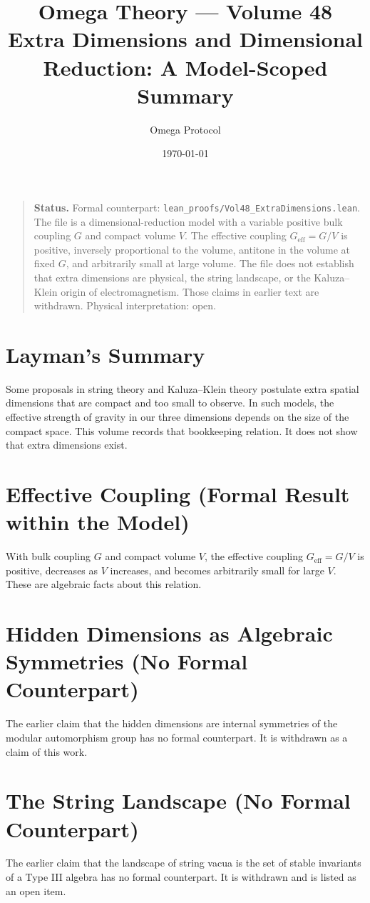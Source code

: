 \documentclass[11pt, a4paper]{article}
\title{Omega Theory --- Volume 48\\\Large Extra Dimensions and Dimensional Reduction: A Model-Scoped Summary}
\author{Omega Protocol}
\date{\today}
\begin{document}
\maketitle

\begin{quote}
\textbf{Status.} Formal counterpart: \texttt{lean\_proofs/Vol48\_ExtraDimensions.lean}. The file is a dimensional-reduction model with a variable positive bulk coupling $G$ and compact volume $V$. The effective coupling $G_{\text{eff}} = G/V$ is positive, inversely proportional to the volume, antitone in the volume at fixed $G$, and arbitrarily small at large volume. The file does not establish that extra dimensions are physical, the string landscape, or the Kaluza--Klein origin of electromagnetism. Those claims in earlier text are withdrawn. Physical interpretation: open.
\end{quote}

\section*{Layman's Summary}
Some proposals in string theory and Kaluza--Klein theory postulate extra spatial dimensions that are compact and too small to observe. In such models, the effective strength of gravity in our three dimensions depends on the size of the compact space. This volume records that bookkeeping relation. It does not show that extra dimensions exist.

\section{Effective Coupling (Formal Result within the Model)}
With bulk coupling $G$ and compact volume $V$, the effective coupling $G_{\text{eff}} = G/V$ is positive, decreases as $V$ increases, and becomes arbitrarily small for large $V$. These are algebraic facts about this relation.

\section{Hidden Dimensions as Algebraic Symmetries (No Formal Counterpart)}
The earlier claim that the hidden dimensions are internal symmetries of the modular automorphism group has no formal counterpart. It is withdrawn as a claim of this work.

\section{The String Landscape (No Formal Counterpart)}
The earlier claim that the landscape of string vacua is the set of stable invariants of a Type III algebra has no formal counterpart. It is withdrawn and is listed as an open item.
\end{document}
